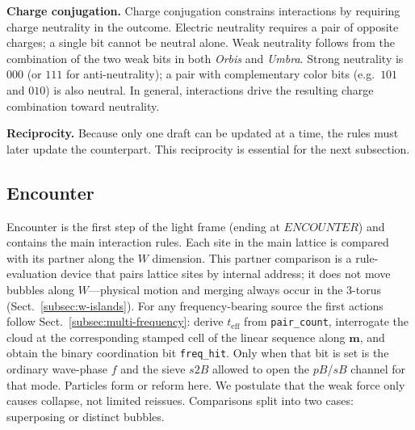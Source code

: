 \documentclass[a4paper]{article}
\begin{document}
\medskip\noindent\textbf{Charge conjugation.} Charge conjugation constrains interactions by requiring charge neutrality in the outcome. Electric neutrality requires a pair of opposite charges; a single bit cannot be neutral alone. Weak neutrality follows from the combination of the two weak bits in both \textit{Orbis} and \textit{Umbra}. Strong neutrality is $000$ (or $111$ for anti-neutrality); a pair with complementary color bits (e.g.\ $101$ and $010$) is also neutral. In general, interactions drive the resulting charge combination toward neutrality.

\medskip\noindent\textbf{Reciprocity.} Because only one draft can be updated at a time, the rules must later update the counterpart. This reciprocity is essential for the next subsection.
\subsection{Encounter} \label{subsec:encounter}
Encounter is the first step of the light frame (ending at $ENCOUNTER$) and contains the main interaction rules. Each site in the main lattice is compared with its partner along the $W$ dimension. This partner comparison is a rule-evaluation device that pairs lattice sites by internal address; it does not move bubbles along $W$---physical motion and merging always occur in the 3-torus (Sect.~\ref{subsec:w-islands}). For any frequency-bearing source the first actions follow Sect.~\ref{subsec:multi-frequency}: derive $t_{\mathrm{eff}}$ from \texttt{pair\_count}, interrogate the cloud at the corresponding stamped cell of the linear sequence along $\boldsymbol{m}$, and obtain the binary coordination bit \texttt{freq\_hit}. Only when that bit is set is the ordinary wave-phase $f$ and the sieve $s2B$ allowed to open the $pB$/$sB$ channel for that mode. Particles form or reform here. We postulate that the weak force only causes collapse, not limited reissues. Comparisons split into two cases: superposing or distinct bubbles.
\end{document}
